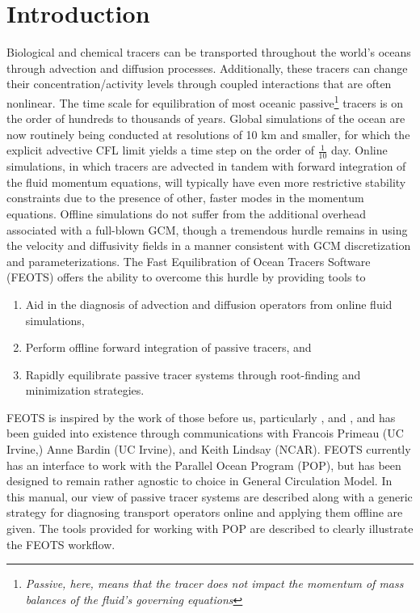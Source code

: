 \documentclass{softwaremanual}
\begin{document}
\chapter{Introduction}

Biological and chemical tracers can be transported throughout the world's oceans through advection and diffusion processes. Additionally, these tracers can change their concentration/activity levels through coupled interactions that are often nonlinear. The time scale for equilibration of most oceanic passive\footnote{\textit{Passive, here, means that the tracer does not impact the momentum of mass balances of the fluid's governing equations}} tracers is on the order of hundreds to thousands of years. Global simulations of the ocean are now routinely being conducted at resolutions of 10 km and smaller, for which the explicit advective CFL limit yields a time step on the order of $\frac{1}{10}$ day. Online simulations, in which tracers are advected in tandem with forward integration of the fluid momentum equations, will typically have even more restrictive stability constraints due to the presence of other, faster modes in the momentum equations. Offline simulations do not suffer from the additional overhead associated with a full-blown GCM, though a tremendous hurdle remains in using the velocity and diffusivity fields in a manner consistent with GCM discretization and parameterizations. The Fast Equilibration of Ocean Tracers Software (FEOTS) offers the ability to overcome this hurdle by providing tools to 
\begin{enumerate}
  \item Aid in the diagnosis of advection and diffusion operators from online fluid simulations,     
  \item Perform offline forward integration of passive tracers, and 
  \item Rapidly equilibrate passive tracer systems through root-finding and minimization strategies.
\end{enumerate}

   FEOTS is inspired by the work of those before us, particularly \citet{Bardin2014}, \citet{Primeau2005} and \citet{Khatiwala2005}, and has been guided into existence through communications with Francois Primeau (UC Irvine,) Anne Bardin (UC Irvine), and Keith Lindsay (NCAR). FEOTS currently has an interface to work with the Parallel Ocean Program (POP), but has been designed to remain rather agnostic to choice in General Circulation Model. In this manual, our view of passive tracer systems are described along with a generic strategy for diagnosing transport operators online and applying them offline are given. The tools provided for working with POP are described to clearly illustrate the FEOTS workflow.
\end{document}
